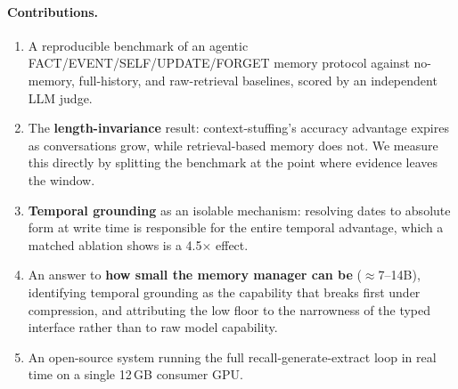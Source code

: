 \paragraph{Contributions.}
\begin{enumerate}
  \item A reproducible benchmark of an agentic FACT/EVENT/SELF/UPDATE/FORGET memory
  protocol against no-memory, full-history, and raw-retrieval baselines, scored by
  an independent LLM judge.
  \item The \textbf{length-invariance} result: context-stuffing's accuracy advantage
  expires as conversations grow, while retrieval-based memory does not. We measure
  this directly by splitting the benchmark at the point where evidence leaves the window.
  \item \textbf{Temporal grounding} as an isolable mechanism: resolving dates to
  absolute form at write time is responsible for the entire temporal advantage,
  which a matched ablation shows is a 4.5$\times$ effect.
  \item An answer to \textbf{how small the memory manager can be} ($\approx$7--14B),
  identifying temporal grounding as the capability that breaks first under
  compression, and attributing the low floor to the narrowness of the typed
  interface rather than to raw model capability.
  \item An open-source system running the full recall-generate-extract loop in real
  time on a single 12\,GB consumer GPU.
\end{enumerate}
